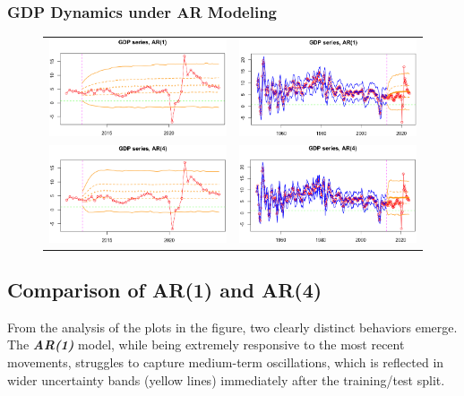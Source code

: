 \documentclass{Configuration_Files/PoliMi3i_thesis}
\begin{document}
\subsubsection{GDP Dynamics under AR Modeling}
\begin{figure}[H]
  \centering
  \begin{tabular}{@{}cc@{}}
    \includegraphics[angle=270,width=0.33\linewidth]{AR(1)z.png} &
    \includegraphics[angle=270,width=0.33\linewidth]{AR(1)f.png} \\
    \includegraphics[angle=270,width=0.33\linewidth]{AR(4)z.png} &
    \includegraphics[angle=270,width=0.33\linewidth]{AR(4)f.png}
  \end{tabular}
\end{figure}
\restoregeometry

\subsection*{Comparison of AR(1) and AR(4)}
From the analysis of the plots in the figure, two clearly distinct behaviors emerge. The \textbf{\textit{AR(1)}} model, while being extremely responsive to the most recent movements, struggles to capture medium-term oscillations, which is reflected in wider uncertainty bands (yellow lines) immediately after the training/test split.
\end{document}
